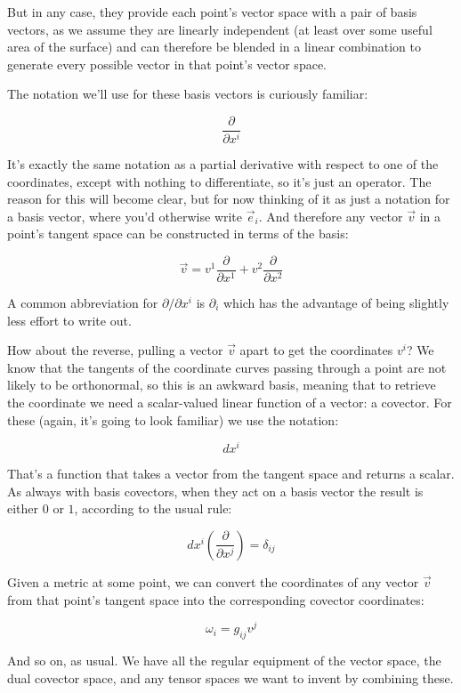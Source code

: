 But in any case, they provide each point's vector space with a pair of basis vectors, as we assume they are linearly independent (at least over some useful area of the surface) and can therefore be blended in a linear combination to generate every possible vector in that point's vector space.

The notation we'll use for these basis vectors is curiously familiar:

$$
\frac{\partial}{\partial x^i}
$$

It's exactly the same notation as a partial derivative with respect to one of the coordinates, except with nothing to differentiate, so it's just an operator. The reason for this will become clear, but for now thinking of it as just a notation for a basis vector, where you'd otherwise write $\vec{e}_i$. And therefore any vector $\vec{v}$ in a point's tangent space can be constructed in terms of the basis:

$$
\vec{v} 
= 
v^1 \frac{\partial}{\partial x^1}
+
v^2 \frac{\partial}{\partial x^2}
$$

A common abbreviation for $\partial / \partial x^i$ is $\partial_i $ which has the advantage of being slightly less effort to write out.

How about the reverse, pulling a vector $\vec{v}$ apart to get the coordinates $v^i$? We know that the tangents of the coordinate curves passing through a point are not likely to be orthonormal, so this is an awkward basis, meaning that to retrieve the coordinate we need a scalar-valued linear function of a vector: a covector. For these (again, it's going to look familiar) we use the notation:

$$
dx^i
$$

That's a function that takes a vector from the tangent space and returns a scalar. As always with basis covectors, when they act on a basis vector the result is either $0$ or $1$, according to the usual rule:

$$
dx^i \left( \frac{\partial}{\partial x^j} \right)
=
\delta_{ij}
$$

Given a metric at some point, we can convert the coordinates of any vector $\vec{v}$ from that point's tangent space into the corresponding covector coordinates:

$$
\omega_i = g_{ij} v^j
$$

And so on, as usual. We have all the regular equipment of the vector space, the dual covector space, and any tensor spaces we want to invent by combining these.

